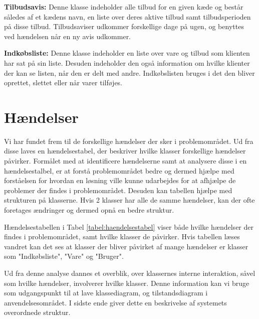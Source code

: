 \textbf{Tilbudsavis:}
Denne klasse indeholder alle tilbud for en given kæde og består således af et kædens navn, en liste over deres aktive tilbud samt tilbudsperioden på disse tilbud. Tilbudsaviser udkommer forskellige dage på ugen, og benyttes ved hændelsen når en ny avis udkommer.

\textbf{Indkøbsliste:}
Denne klasse indeholder en liste over vare og tilbud som klienten har sat på sin liste. Desuden indeholder den også information om hvilke klienter der kan se listen, når den er delt med andre. Indkøbslisten bruges i det den bliver oprettet, slettet eller når varer tilføjes.


\section{Hændelser}
Vi har fundet frem til de forskellige hændelser der sker i problemområdet. 
Ud fra disse laves en hændelsestabel, der beskriver hvilke klasser forskellige hændelser påvirker.
Formålet med at identificere hændelserne samt at analysere disse i en hændelsestalbel, er at forstå problemområdet bedre og dermed hjælpe med forståelsen for hvordan en løsning ville kunne udarbejdes for at afhjælpe de problemer der findes i problemområdet. Desuden kan tabellen hjælpe med strukturen på klasserne. 
Hvis 2 klasser har alle de samme hændelser, kan der ofte foretages ændringer og dermed opnå en bedre struktur.



Hændelsestabellen i Tabel \ref{tabel:haendelsestabel} viser både hvilke hændelser der findes i problemområdet, samt hvilke klasser de påvirker.
Hvis tabellen læses vandret kan det ses at klasser der bliver påvirket af mange hændelser er klasser som "Indkøbsliste", "Vare" og "Bruger".


Ud fra denne analyse dannes et overblik, over klassernes interne interaktion, såvel som hvilke hændelser, involverer hvilke klasser.
Denne information kan vi bruge som udgangspunkt til at lave klassediagram, og tilstandsdiagram i anvendelsesområdet.
I sidste ende giver dette en beskrivelse af systemets overordnede struktur.